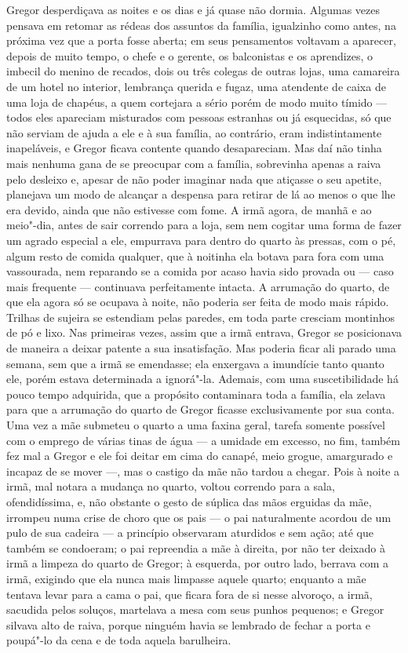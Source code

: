 Gregor desperdiçava as noites e os dias e já quase não dormia. Algumas
vezes pensava em retomar as rédeas dos assuntos da família, igualzinho
como antes, na próxima vez que a porta fosse aberta; em seus pensamentos
voltavam a aparecer, depois de muito tempo, o chefe e o gerente, os
balconistas e os aprendizes, o imbecil do menino de recados, dois ou três
colegas de outras lojas, uma camareira de um hotel no interior,
lembrança querida e fugaz, uma atendente de caixa de uma loja de chapéus,
a quem cortejara a sério porém de modo muito tímido --- todos eles apareciam
misturados com pessoas estranhas ou já esquecidas, só que não serviam de
ajuda a ele e à sua família, ao contrário, eram indistintamente
inapeláveis, e Gregor ficava contente quando desapareciam. Mas daí não
tinha mais nenhuma gana de se preocupar com a família, sobrevinha apenas a
raiva pelo desleixo e, apesar de não poder imaginar nada que atiçasse o
seu apetite, planejava um modo de alcançar a despensa para retirar de lá
ao menos o que lhe era devido, ainda que não estivesse com fome. A irmã
agora, de manhã e ao meio"-dia, antes de sair correndo para a loja, sem nem
cogitar uma forma de fazer um agrado especial a ele, empurrava para dentro
do quarto às pressas, com o pé, algum resto de comida qualquer, que à
noitinha ela botava para fora com uma vassourada, nem reparando se a
comida por acaso havia sido provada ou --- caso mais frequente --- continuava
perfeitamente intacta. A arrumação do quarto, de que ela agora só se
ocupava à noite, não poderia ser feita de modo mais rápido. Trilhas de
sujeira se estendiam pelas paredes, em toda parte cresciam montinhos de pó
e lixo. Nas primeiras vezes, assim que a irmã entrava, Gregor se
posicionava de maneira a deixar patente a sua insatisfação. Mas poderia ficar ali parado uma
semana, sem que a irmã se emendasse; ela enxergava a imundície tanto
quanto ele, porém estava determinada a ignorá"-la. Ademais, com uma
suscetibilidade há pouco tempo adquirida, que a propósito contaminara toda
a família, ela zelava para que a arrumação do quarto de Gregor ficasse
exclusivamente por sua conta. Uma vez a mãe submeteu o quarto a uma faxina
geral, tarefa somente possível com o emprego de várias tinas de
água --- a umidade em excesso, no fim, também fez mal a Gregor e ele foi
deitar em cima do canapé, meio grogue, amargurado e incapaz de se mover ---,
mas o castigo da mãe não tardou a chegar. Pois à noite a irmã, mal notara
a mudança no quarto, voltou correndo para a sala, ofendidíssima, e, não
obstante o gesto de súplica das mãos erguidas da mãe, irrompeu numa crise
de choro que os pais --- o pai naturalmente acordou de um pulo de sua
cadeira --- a princípio observaram aturdidos e sem ação; até que também se
condoeram; o pai repreendia a mãe à direita, por não ter deixado à irmã a
limpeza do quarto de Gregor; à esquerda, por outro lado, berrava com a
irmã, exigindo que ela nunca mais limpasse aquele quarto; enquanto a mãe
tentava levar para a cama o pai, que ficara fora de si nesse alvoroço, a
irmã, sacudida pelos soluços, martelava a mesa com seus punhos pequenos; e
Gregor silvava alto de raiva, porque ninguém havia se lembrado de fechar a
porta e poupá"-lo da cena e de toda aquela barulheira.

